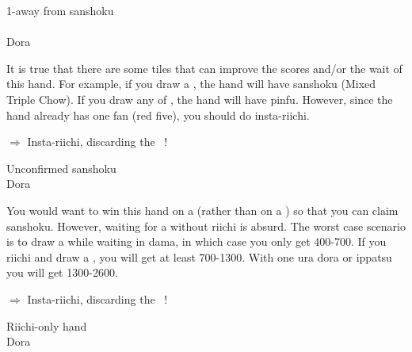 \begin{itembox}[r]{1-away from {\jap sanshoku}}
\bp
{}\\ \vspace{-18pt}
\rfw{}\bei\bei\dong~~\\
\hspace{311pt}\footnotesize{\jap Dora}
\ep {}
\vspace{-15pt}
\end{itembox}

\noindent It is true that there are some tiles that can improve the scores and/or the wait of this hand. For example, if you draw a {\large{}}, the hand will have {\jap sanshoku} (Mixed Triple Chow). If you draw any of {\large{}}, the hand will have {\jap pinfu}. However, since the hand already has one {\jap fan} (red five), you should do insta-{\jap riichi}. 

\begin{center}
{\large $\Rightarrow$ Insta-{\jap riichi}, discarding the \dong ~!}
\end{center}

\bigskip
\begin{itembox}[r]{Unconfirmed {\jap sanshoku}}
\bp
{}~~\bei\\
\hspace{311pt}\footnotesize{\jap Dora}
\ep {}
\vspace{-15pt}
\end{itembox}

\noindent You would want to win this hand on a {\large{}} (rather than on a {\large{}}) so that you can claim {\jap sanshoku}. However, waiting for a {\large{}} without {\jap riichi} is absurd. The worst case scenario is to draw a {\large{}} while waiting in {\jap dama}, in which case you only get 400-700. If you {\jap riichi} and draw a {\large{}}, you will get at least 700-1300. With one {\jap ura dora} or {\jap ippatsu} you will get 1300-2600. 
\begin{center}
{\large $\Rightarrow$ Insta-{\jap riichi}, discarding the ~!}
\end{center}

\bigskip
\begin{itembox}[r]{{\jap Riichi}-only hand}
\bp
{}\bai\bai~~\bei\\
\hspace{311pt}\footnotesize{\jap Dora}
\ep
\vspace{-15pt}
\end{itembox}

